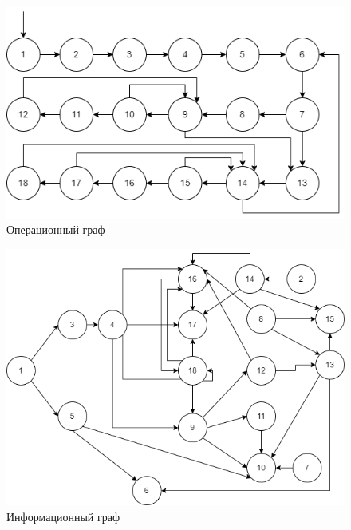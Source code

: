 \documentclass[a4paper,14pt, unknownkeysallowed]{extreport}
\begin{document}
\begin{figure}[h!]
	\centering
	\includegraphics[width=1\linewidth]{img/op.png}
	\caption{Операционный граф}
	\label{fig:op}
\end{figure}

\begin{figure}[h!]
	\centering
	\includegraphics[width=1\linewidth]{img/info.png}
	\caption{Информационный граф}
	\label{fig:info}
\end{figure}
\end{document}
